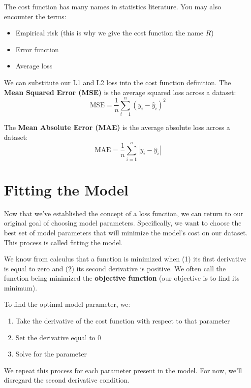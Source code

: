 \documentclass[
  letterpaper,
  DIV=11,
  numbers=noendperiod]{scrreprt}
\providecommand{\tightlist}{%
  \setlength{\itemsep}{0pt}\setlength{\parskip}{0pt}}\usepackage{longtable,booktabs,array}
\begin{document}
The cost function has many names in statistics literature. You may also
encounter the terms:

\begin{itemize}
\tightlist
\item
  Empirical risk (this is why we give the cost function the name \(R\))
\item
  Error function
\item
  Average loss
\end{itemize}

We can substitute our L1 and L2 loss into the cost function definition.
The \textbf{Mean Squared Error (MSE)} is the average squared loss across
a dataset: \[\text{MSE} = \frac{1}{n} \sum_{i=1}^n (y_i - \hat{y}_i)^2\]

The \textbf{Mean Absolute Error (MAE)} is the average absolute loss
across a dataset:
\[\text{MAE}= \frac{1}{n} \sum_{i=1}^n |y_i - \hat{y}_i|\]

\hypertarget{fitting-the-model}{%
\section{Fitting the Model}\label{fitting-the-model}}

Now that we've established the concept of a loss function, we can return
to our original goal of choosing model parameters. Specifically, we want
to choose the best set of model parameters that will minimize the
model's cost on our dataset. This process is called fitting the model.

We know from calculus that a function is minimized when (1) its first
derivative is equal to zero and (2) its second derivative is positive.
We often call the function being minimized the \textbf{objective
function} (our objective is to find its minimum).

To find the optimal model parameter, we:

\begin{enumerate}
\def\labelenumi{\arabic{enumi}.}
\tightlist
\item
  Take the derivative of the cost function with respect to that
  parameter
\item
  Set the derivative equal to 0
\item
  Solve for the parameter
\end{enumerate}

We repeat this process for each parameter present in the model. For now,
we'll disregard the second derivative condition.
\end{document}
